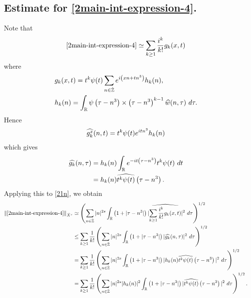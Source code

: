 \subsection{Estimate for \eqref{2main-int-expression-4}.}
Note that
%
%
\begin{equation}
	\label{21n}
	\begin{split}
		\eqref{2main-int-expression-4} \simeq \sum_{k \ge 1}
		\frac{i^k}{k!}g_k(x,t)
	\end{split}
\end{equation}
%
%
where 
%
%
\begin{equation*}
	\begin{split}
		& g_k(x,t) = t^k \psi(t) \sum_{n \in \dot{\mathbb{Z}}} e^{i\left( xn + tn^{3}
		\right)} h_k(n),
		\\
		& h_k(n) = \int_{\mathbb{R}} \psi \left( \tau - n^3 \right) \times \left(
		\tau - n^3 \right)^{k -1} \widehat{w}(n, \tau) \ d \tau.
	\end{split}
\end{equation*}
%
%
Hence
%
%
\begin{equation*}
	\begin{split}
		\widehat{g_k^x}(n, t) = t^{k} \psi(t) e^{i t n^3} h_k(n)
	\end{split}
\end{equation*}
%
%
which gives
%
%
\begin{equation*}
	\begin{split}
		\widehat{g_k}(n, \tau)
		& = h_k(n) \int_{\mathbb{R}} e^{-it\left( \tau - n^3 \right)}
		t^{k}\psi(t) \ dt
		\\
		& = h_k(n) \widehat{t^{k}\psi(t)} \left( \tau - n^3 \right).
	\end{split}
\end{equation*}
%
%
Applying this to \eqref{21n}, we obtain
%
%
\begin{equation}
	\label{22n}
	\begin{split}
		\|\eqref{2main-int-expression-4}\|_{\dot{X}^s} 
		& \simeq \left( \sum_{n \in \dot{\mathbb{Z}}} |n|^{2s} \int_{\mathbb{R}} \left( 1 + | \tau -
		n^3
		|
		\right) | \widehat{\sum_{k \ge 1} \frac{i^k}{k!}g_k(x,t)} |^2 \ d \tau
		\right)^{1/2}
		\\
		& \le \sum_{k \ge 1} \frac{1}{k!}\left( \sum_{n \in \dot{\mathbb{Z}}} |n|^{2s}
		\int_{\mathbb{R}} \left( 1 + | \tau - n^3 | \right) | \widehat{g_k}(n, \tau) |^2 \
		d \tau \right)^{1/2}
		\\
		& = \sum_{k \ge 1} \frac{1}{k!} \left( \sum_{n \in \dot{\mathbb{Z}}} |n|^{2s}
		\int_{\mathbb{R}} \left( 1 + | \tau - n^3 | \right) | h_k(n) \widehat{t^k
		\psi(t)} \left( \tau - n^3 \right) |^2 \ d \tau \right)^{1/2}
		\\
		& = \sum_{k \ge 1} \frac{1}{k!} \left( \sum_{n \in \dot{\mathbb{Z}}} |n|^{2s} |
		h_k(n) |^2 \int_{\mathbb{R}} \left( 1 + | \tau - n^3 | \right) | \widehat{t^k
		\psi(t)} \left( \tau - n^3 \right) |^2 \ d \tau \right)^{1/2}.
	\end{split}
\end{equation}
